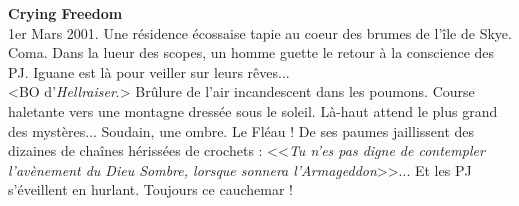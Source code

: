\documentclass[11pt,twoside,a4paper]{book}
\begin{document}

\textbf{\large Crying Freedom}~\\

1er Mars 2001. Une r{\'e}sidence {\'e}cossaise tapie au coeur des brumes de l'{\^i}le de Skye. Coma. Dans la lueur des scopes, un homme guette le retour {\`a} la conscience des PJ. Iguane est l{\`a} pour veiller sur leurs r{\^e}ves...~\\

<BO d'\emph{Hellraiser}.> Br{\^u}lure de l'air incandescent dans les poumons. Course haletante vers une montagne dress{\'e}e sous le soleil. L{\`a}-haut attend le plus grand des myst{\`e}res... Soudain, une ombre. Le Fl{\'e}au ! De ses paumes jaillissent des dizaines de cha{\^i}nes h{\'e}riss{\'e}es de crochets : <<\emph{Tu n'es pas digne de contempler l'av{\`e}nement du Dieu Sombre, lorsque sonnera l'Armageddon}>>... Et les PJ s'{\'e}veillent en hurlant. Toujours ce cauchemar !~\\
\end{document}
